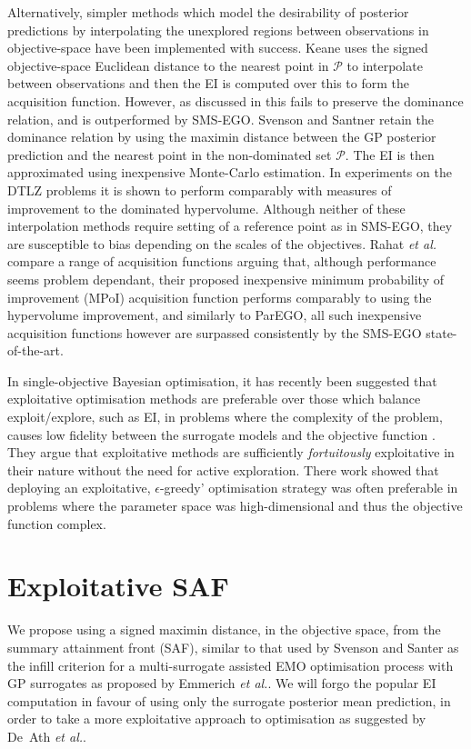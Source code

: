 \documentclass[conference]{IEEEtran}
\makeatletter
\newcommand\hpv{dominated hypervolume\xspace}
\newcommand\smsego{SMS-EGO\xspace}
\newcommand\ei{EI\xspace}
\newcommand\gp{GP\xspace}
\newcommand\maximin{maximin\xspace}
\newcommand*{\etal}{\textit{et al.}\@\xspace}
\makeatother
\begin{document}
Alternatively, simpler methods which model the desirability of posterior predictions by interpolating the unexplored regions between observations in objective-space have been implemented with success. Keane \cite{keane2006statistical} uses the signed objective-space Euclidean distance to the nearest point in $\mathcal{P}$ to interpolate between observations and then the \ei is computed over this to form the acquisition function. However, as discussed in \cite{wagner2010expected} this fails to preserve the dominance relation, and is outperformed by \smsego. Svenson and Santner  \cite{svenson2016multiobjective} retain the dominance relation by using the maximin distance between the \gp posterior prediction and the nearest point in the non-dominated set $\mathcal{P}$. The \ei is then approximated using inexpensive Monte-Carlo estimation. In experiments on the DTLZ problems \cite{deb2005scalable} it is shown to perform comparably with measures of improvement to the \hpv. Although neither of these interpolation methods require setting of a reference point as in \smsego, they are susceptible to bias depending on the scales of the objectives. Rahat \etal \cite{rahat2017alternative} compare a range of acquisition functions arguing that, although performance seems problem dependant, their proposed inexpensive minimum probability of improvement (MPoI) acquisition function performs comparably to using the hypervolume improvement, and similarly to ParEGO, all such inexpensive acquisition functions however are surpassed consistently by the \smsego state-of-the-art.

In single-objective Bayesian optimisation, it has recently been suggested that exploitative optimisation methods are preferable over those which balance exploit/explore, such as \ei, in problems where the complexity of the problem, causes low fidelity between the surrogate models and the objective function \cite{death2019greed}. They argue that exploitative methods are sufficiently \textit{fortuitously} exploitative in their nature without the need for active exploration. There work showed that deploying an exploitative, $\epsilon$-greedy' optimisation strategy was often preferable in problems where the parameter space was high-dimensional and thus the objective function complex.


\section{Exploitative SAF}\label{section:our_method}
We propose using a signed \maximin distance, in the objective space, from the summary attainment front (SAF), similar to that used by Svenson and Santer \cite{svenson2016multiobjective} as the infill criterion for a multi-surrogate assisted EMO optimisation process with \gp surrogates as proposed by Emmerich \etal \cite{emmerich2006single}. We will forgo the popular \ei computation in favour of using only the surrogate posterior mean prediction, in order to take a more exploitative approach to optimisation as suggested by De~Ath \etal \cite{death2019greed}. 
\end{document}
